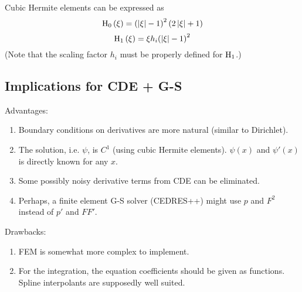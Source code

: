 Cubic Hermite elements can be expressed as
\begin{equation}
{{\rm H}_0}\left( \xi  \right) = {\left( {\left| \xi  \right| - 1} \right)^2}\left( {2\left| \xi  \right| + 1} \right)
\end{equation}
\begin{equation}
{{\rm H}_1}\left( \xi  \right) = \xi {h_i}{\left( {\left| \xi  \right| - 1} \right)^2}
\end{equation}
(Note that the scaling factor $h_i$ must be properly defined for
${\rm H}_1$.)



\subsection{Implications for CDE + G-S}

Advantages:
\begin{enumerate}
	\item Boundary conditions on derivatives are more natural (similar to Dirichlet).
	\item The solution, i.e. $\psi$, is $C^1$ (using cubic Hermite elements). 
	$\psi\left( x\right)$ and $\psi'\left( x\right)$ is directly known for any $x$.
	\item Some possibly noisy derivative terms from CDE can be eliminated.
	\item Perhaps, a finite element G-S solver (CEDRES++) might use $p$ and $F^2$ instead of $p'$ and $FF'$.
\end{enumerate}
Drawbacks:
\begin{enumerate}
	\item FEM is somewhat more complex to implement.
	\item For the integration, the equation coefficients should be given as functions. Spline interpolants are supposedly well suited.
\end{enumerate}